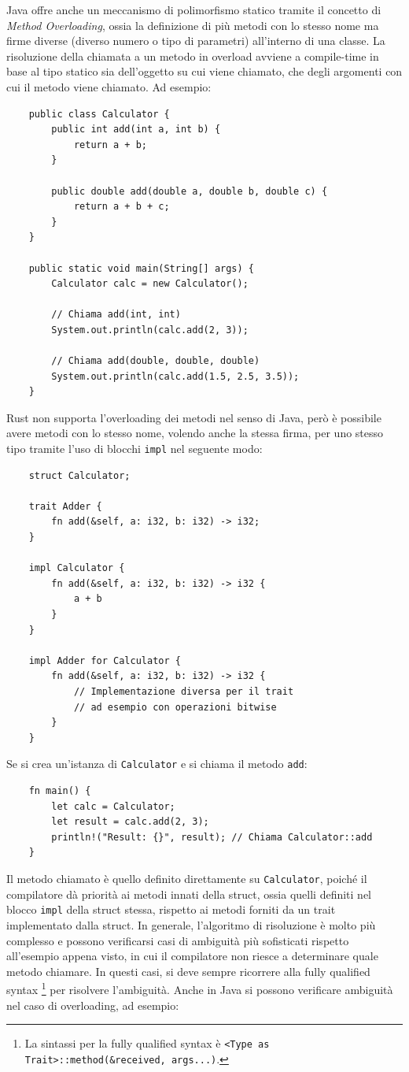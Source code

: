 Java offre anche un meccanismo di polimorfismo statico tramite il concetto di \textit{Method Overloading}, ossia la definizione di più metodi con lo stesso nome ma firme diverse (diverso numero o tipo di parametri) all'interno di una classe. La risoluzione della chiamata a un metodo in overload avviene a compile-time in base al tipo statico sia dell'oggetto su cui viene chiamato, che degli argomenti con cui il metodo viene chiamato. Ad esempio:
\begin{verbatim}
    public class Calculator {
        public int add(int a, int b) {
            return a + b;
        }

        public double add(double a, double b, double c) {
            return a + b + c;
        }
    }

    public static void main(String[] args) {
        Calculator calc = new Calculator();

        // Chiama add(int, int)
        System.out.println(calc.add(2, 3));  

        // Chiama add(double, double, double)
        System.out.println(calc.add(1.5, 2.5, 3.5)); 
    }
\end{verbatim}
Rust non supporta l'overloading dei metodi nel senso di Java, però è possibile avere metodi con lo stesso nome, volendo anche la stessa firma, per uno stesso tipo tramite l'uso di blocchi \texttt{impl} nel seguente modo:
\begin{verbatim}
    struct Calculator;

    trait Adder {
        fn add(&self, a: i32, b: i32) -> i32;
    }

    impl Calculator {
        fn add(&self, a: i32, b: i32) -> i32 {
            a + b
        }
    }

    impl Adder for Calculator {
        fn add(&self, a: i32, b: i32) -> i32 {
            // Implementazione diversa per il trait
            // ad esempio con operazioni bitwise            
        }
    }
\end{verbatim}
Se si crea un'istanza di \texttt{Calculator} e si chiama il metodo \texttt{add}:
\begin{verbatim}
    fn main() {
        let calc = Calculator;
        let result = calc.add(2, 3);
        println!("Result: {}", result); // Chiama Calculator::add
    }
\end{verbatim}
Il metodo chiamato è quello definito direttamente su \texttt{Calculator}, poiché il compilatore dà priorità ai metodi innati della struct, ossia quelli definiti nel blocco \texttt{impl} della struct stessa, rispetto ai metodi forniti da un trait implementato dalla struct. In generale, l'algoritmo di risoluzione è molto più complesso e possono verificarsi casi di ambiguità più sofisticati rispetto all'esempio appena visto, in cui il compilatore non riesce a determinare quale metodo chiamare. In questi casi, si deve sempre ricorrere alla fully qualified syntax \footnote{La sintassi per la fully qualified syntax è \texttt{<Type as Trait>::method(\&received, args...)}.} per risolvere l'ambiguità. Anche in Java si possono verificare ambiguità nel caso di overloading, ad esempio:
